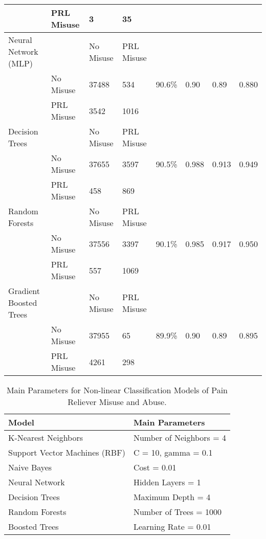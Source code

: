 \documentclass[sigconf]{acmart}
\begin{document}
\begin{table*}[ht]
\begin{tabular}{llllllll}
     & PRL Misuse & 3 & 35 &  &  &  & \\
    \midrule
    Neural Network (MLP) & & No Misuse & PRL Misuse &  &  &  & \\
     & No Misuse & 37488 & 534 & 90.6\% & 0.90 & 0.89 & 0.880 \\
     & PRL Misuse & 3542 & 1016 &  &  &  & \\
    \midrule
    Decision Trees & & No Misuse & PRL Misuse &  &  &  & \\
     & No Misuse & 37655 & 3597 & 90.5\% & 0.988 & 0.913 & 0.949 \\
     & PRL Misuse &  458 &  869 &  &  &  & \\
    \midrule
    Random Forests & & No Misuse & PRL Misuse &  &  &  & \\
     & No Misuse & 37556 & 3397 & 90.1\% & 0.985 & 0.917 & 0.950 \\
     & PRL Misuse &  557 & 1069 &  &  &  & \\
    \midrule
    Gradient Boosted Trees & & No Misuse & PRL Misuse &  &  &  & \\
     & No Misuse & 37955 &  65 & 89.9\% & 0.90 & 0.89 & 0.895 \\
     & PRL Misuse & 4261 & 298 &  &  &  & \\
    \bottomrule
  \end{tabular}
\end{table*}

 
\begin{table}
  \caption{Main Parameters for Non-linear Classification Models of 
  Pain Reliever Misuse and Abuse.}
  \label{tab:freq}
  \begin{tabular}{ll}
    \toprule
    Model & Main Parameters \\
    \midrule
    K-Nearest Neighbors & Number of Neighbors = 4 \\
    Support Vector Machines (RBF) & C = 10, gamma = 0.1 \\
    Naive Bayes & Cost = 0.01 \\
    Neural Network & Hidden Layers = 1 \\
    Decision Trees & Maximum Depth = 4 \\ 
    Random Forests & Number of Trees = 1000 \\
    Boosted Trees & Learning Rate = 0.01 \\ 
    \bottomrule
  \end{tabular}
\end{table}
\end{document}
